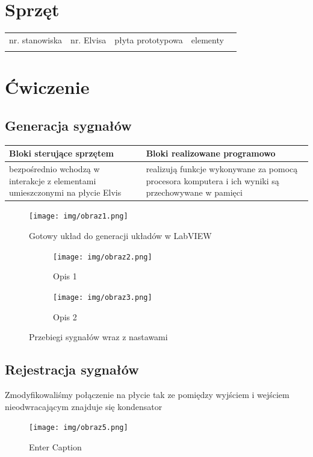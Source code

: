 \documentclass[11pt]{article}
\begin{document}
\section{Sprzęt}
\begin{table}[H]
\centering
\begin{tabular}{lllll}
\cline{1-4}
\multicolumn{1}{|l|}{nr. stanowiska} & \multicolumn{1}{l|}{nr. Elvisa} & \multicolumn{1}{l|}{płyta prototypowa} & \multicolumn{1}{l|}{elementy} &  \\ \cline{1-4}
\multicolumn{1}{|l|}{}               & \multicolumn{1}{l|}{}           & \multicolumn{1}{l|}{}                  & \multicolumn{1}{l|}{}         &  \\ \cline{1-4}
\end{tabular}
\end{table}

\section{Ćwiczenie}
\subsection{Generacja sygnałów}

\begin{table}[H]
\centering
\begin{tabular}{|p{5cm}|p{5cm}|}
\hline
Bloki sterujące sprzętem & Bloki realizowane programowo \\ \hline
bezpośrednio wchodzą w interakcje z elementami umieszczonymi na płycie Elvis &  realizują funkcje wykonywane za pomocą procesora komputera i ich wyniki są przechowywane w pamięci \\ \hline
\end{tabular}
\end{table}


\begin{figure}[H]
    \centering
    \texttt{[image: img/obraz1.png]}
    \caption{Gotowy układ do generacji układów w LabVIEW}
    \label{fig:placeholder}
\end{figure}

\begin{figure}[H]
  \centering
  \begin{subfigure}{.48\textwidth}
    \centering
    \texttt{[image: img/obraz2.png]}
    \caption{Opis 1}
    \label{fig:sub1}
  \end{subfigure}\hfill
  \begin{subfigure}{.48\textwidth}
    \centering
    \texttt{[image: img/obraz3.png]}
    \caption{Opis 2}
    \label{fig:sub2}
  \end{subfigure}

  \caption{Przebiegi sygnałów wraz z nastawami}
  \label{fig:przebiegi}
\end{figure}


\subsection{Rejestracja sygnałów}
Zmodyfikowaliśmy połączenie na płycie tak ze pomiędzy wyjściem i wejściem nieodwracającym znajduje się kondensator 

\begin{figure}[H]
    \centering
    \texttt{[image: img/obraz5.png]}
    \caption{Enter Caption}
    \label{fig:placeholder}
\end{figure}
\end{document}
